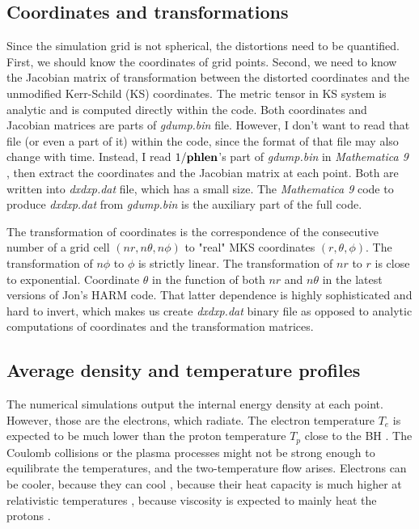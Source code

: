 \documentclass{emulateapj}
\newcommand{\mat}{\textit{Mathematica 9 }}
\begin{document}
\subsection{Coordinates and transformations}
Since the simulation grid is not spherical, the distortions need to be quantified.
First, we should know the coordinates of grid points. Second, we need to know the Jacobian matrix of transformation between the distorted coordinates and
the unmodified Kerr-Schild (KS) coordinates. The metric tensor in KS system is analytic and is computed directly within the code.
Both coordinates and Jacobian matrices are parts of \textit{gdump.bin} file. However, I don't want to read that file (or even a part of it) within the code,
since the format of that file may also change with time. Instead, I read $1/{\bf phlen}$'s part of \textit{gdump.bin} in \mat, 
then extract the coordinates and the Jacobian matrix at each point. Both are written into \textit{dxdxp.dat} file, which has a small size.
The \mat code to produce \textit{dxdxp.dat} from \textit{gdump.bin} is the auxiliary part of the full code.

The transformation of coordinates is the correspondence of the consecutive number of a grid cell $(nr,n\theta,n\phi)$ to "real" MKS coordinates $(r,\theta,\phi)$.
The transformation of $n\phi$ to $\phi$ is strictly linear. The transformation of $nr$ to $r$ is close to exponential.
Coordinate $\theta$ in the function of both $nr$ and $n\theta$ in the latest versions of Jon's HARM code.
That latter dependence is highly sophisticated and hard to invert, which makes us create \textit{dxdxp.dat} binary file as opposed to analytic computations of coordinates
and the transformation matrices.

\subsection{Average density and temperature profiles}
The numerical simulations output the internal energy density at each point. However, those are the electrons, which radiate.
The electron temperature $T_e$ is expected to be much lower than the proton temperature $T_p$ close to the BH \citep{Narayan:1995kj}.
The Coulomb collisions or the plasma processes might not be strong enough to equilibrate the temperatures, and the two-temperature flow arises.
Electrons can be cooler, because they can cool \citep{Drappeau:2012dq}, because their heat capacity is much higher at relativistic temperatures \citep{Shcherbakov:2010cond},
because viscosity is expected to mainly heat the protons \citep{Narayan:1995kj,Sharma_heating:2007}.
\end{document}
